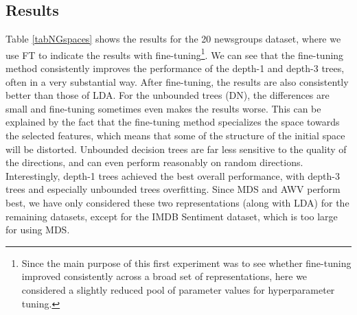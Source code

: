 \subsection{Results}

Table \ref{tabNGspaces} shows the results for the 20 newsgroups dataset, where we use FT to indicate the results with fine-tuning\footnote{Since the main purpose of this first experiment was to see whether fine-tuning improved consistently across a broad set of representations, here we considered a slightly reduced pool of parameter values for hyperparameter tuning.}.  %
We can see that the fine-tuning method consistently improves the performance of the depth-1 and depth-3 trees, often in a very substantial way. After fine-tuning, the results are also consistently better than those of LDA. For the unbounded trees (DN), the differences are small and fine-tuning sometimes even makes the results worse. This can be explained by the fact that the fine-tuning method specializes the space towards the selected features, which means that some of the structure of the initial space will be distorted. Unbounded decision trees are far less sensitive to the quality of the directions, and can even perform reasonably on random directions.
Interestingly, depth-1 trees achieved the best overall performance, with depth-3 trees and especially unbounded trees overfitting. Since MDS and AWV perform best, we have only considered these two representations (along with LDA) for the remaining datasets, except for the IMDB Sentiment dataset, which is too large for using MDS.

